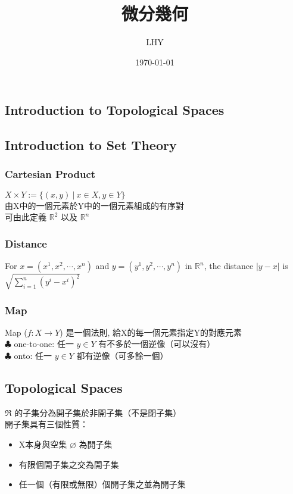\documentclass{article}
\begin{document}
\begin{CJK}{UTF8}{bsmi}
\title{微分幾何}
\author{LHY}
\date{\today}
\maketitle
\tableofcontents

\newpage
\section{Introduction to Topological Spaces}
\subsection{Introduction to Set Theory}
\subsubsection{Cartesian Product}
$X \times Y :=\{(x,y)\ |\ x\in X, y \in Y\} $
\\ 由X中的一個元素於Y中的一個元素組成的有序對
\\ 可由此定義 $\mathbb{R}^2$ 以及 $\mathbb{R}^n$
\subsubsection{Distance}
For $x=(x^1,x^2,\cdots,x^n)$ and $y=(y^1,y^2,\cdots,y^n)$ in ${\mathbb{R}^n}$, the distance $|y-x|$ is $\sqrt{\sum_{i=1}^n{(y^i-x^i)^2}}$
\subsubsection{Map}
Map ($f:X\rightarrow Y$) 是一個法則, 給X的每一個元素指定Y的對應元素
\\ $\clubsuit$ one-to-one: 任一 $y\in Y$ 有不多於一個逆像（可以沒有）
\\ $\clubsuit$ onto: 任一 $y\in Y$ 都有逆像（可多餘一個）
\subsection{Topological Spaces}
$\Re$ 的子集分為開子集於非開子集（不是閉子集）\\
開子集具有三個性質：
\begin{itemize}
  \item X本身與空集  $\varnothing$ 為開子集
  \item 有限個開子集之交為開子集
  \item 任一個（有限或無限）個開子集之並為開子集
\end{itemize}

\end{CJK}
\end{document}
